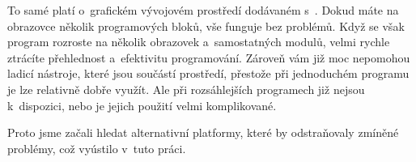 To samé platí o~grafickém vývojovém prostředí dodávaném s~\EVthree. Dokud máte na obrazovce několik programových bloků, vše funguje bez problémů. 
Když se však program rozroste na několik obrazovek a~samostatných modulů, velmi rychle ztrácíte přehlednost a~efektivitu programování.
Zároveň vám již moc nepomohou ladicí nástroje, které jsou součástí prostředí, přestože při jednoduchém programu je lze relativně dobře využít. Ale při rozsáhlejších programech již nejsou k~dispozici, nebo je jejich použití velmi komplikované. 


Proto jsme začali hledat alternativní platformy, které by odstraňovaly zmíněné problémy, což vyústilo v~tuto práci.   

